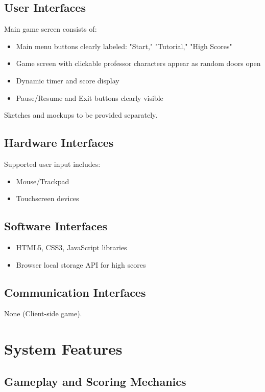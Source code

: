 \documentclass{scrreprt}
\begin{document}
\section{User Interfaces}
Main game screen consists of:
\begin{itemize}
    \item Main menu buttons clearly labeled: "Start," "Tutorial," "High Scores"
    \item Game screen with clickable professor characters appear as random doors open
    \item Dynamic timer and score display
    \item Pause/Resume and Exit buttons clearly visible
\end{itemize}

Sketches and mockups to be provided separately.

\section{Hardware Interfaces}
Supported user input includes:
\begin{itemize}
    \item Mouse/Trackpad
    \item Touchscreen devices
\end{itemize}

\section{Software Interfaces}
\begin{itemize}
    \item HTML5, CSS3, JavaScript libraries
    \item Browser local storage API for high scores
\end{itemize}

\section{Communication Interfaces}
None (Client-side game).

\chapter{System Features}

\section{Gameplay and Scoring Mechanics}
\end{document}
